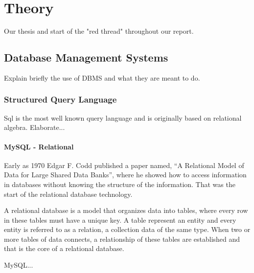 \chapter{Theory}
Our thesis and start of the "red thread" throughout our report.

\section{Database Management Systems}
Explain briefly the use of DBMS and what they are meant to do.

\subsection{Structured Query Language}
Sql is the most well known query language and is originally based on relational algebra. Elaborate...

\subsubsection{MySQL - Relational}
Early as 1970 Edgar F. Codd published a paper named, “A Relational Model of Data for Large Shared Data Banks”, where he showed how to access information in databases without knowing the structure of the information. That was the start of the relational database technology.

A relational database is a model that organizes data into tables, where every row in these tables must have a unique key. A table represent an entity and every entity is referred to as a relation, a collection data of the same type. When two or more tables of data connects, a relationship of these tables are established and that is the core of a relational database.

MySQL...



